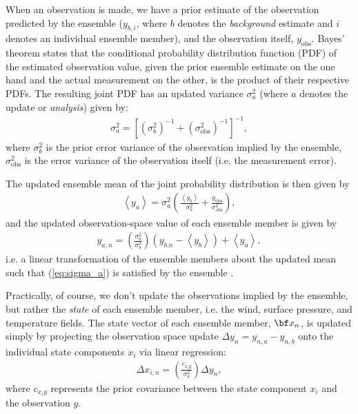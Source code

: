 When an observation is made, we have a prior estimate of the observation predicted by the ensemble ($y_{b,i}$, where $b$ denotes the \textit{background} estimate and $i$ denotes an individual ensemble member), and the observation itself, $y_{\text{obs}}$.
Bayes' theorem states that the conditional probability distribution function (PDF) of the estimated observation value, given the prior ensemble estimate on the one hand and the actual measurement on the other, is the product of their respective PDFs.
The resulting joint PDF has an updated variance $\sigma_a^2$  (where $a$ denotes the update or \textit{analysis})
given by:
\begin{eqnarray}
 \sigma_a^2 = 
\left[
\left( \sigma_b^2  \right)^{-1}+
\left( \sigma_{\text{obs}}^2  \right)^{-1}
\right]^{-1},
\label{eq:sigma_a}
\end{eqnarray}
where $\sigma_b^2$ is  the prior error variance of the observation implied by the ensemble, $\sigma_{\text{obs}}^2$ is the error variance of the observation itself (i.e. the measurement error).

The updated ensemble mean of the joint probability distribution is then given by
\begin{eqnarray}
\left< y_a \right> = \sigma_a^2 
\left(
\frac{\left< y_b \right>}{\sigma_b^2} +
\frac{y_{\text{obs}} }{\sigma_{\text{obs}}^2} 
\right),
\end{eqnarray}
and the updated observation-space value of each ensemble member is given by 
\begin{eqnarray}
 y_{a,n} = 
\left( \frac{\sigma_a^2}{\sigma_b^2}  \right)
\left(
y_{b.n} - \left< y_b  \right> \right)
+ \left< y_a \right>,
\end{eqnarray}
i.e. a linear transformation of the ensemble members about the updated mean such that (\ref{eq:sigma_a}) is satisfied by the ensemble \citep{andersoncollins2006}.


Practically, of course, we don't update the observations implied by the ensemble, but rather the \textit{state} of each ensemble member, i.e. the wind, surface pressure, and temperature fields. 
The state vector of each ensemble member, ${\bf x}_n$, is updated simply by projecting the observation space update $\Delta y_n = y_{n,a}-y_{n,b}$ onto the individual state components $x_i$ via linear regression:
\begin{eqnarray}
 \Delta x_{i,n} = 
\left(
\frac{c_{x_iy}}{\sigma_b^2}
\right)
\Delta y_n,
\end{eqnarray}
where $c_{x_iy}$ represents the prior covariance between the state component $x_i$ and the observation $y$.

